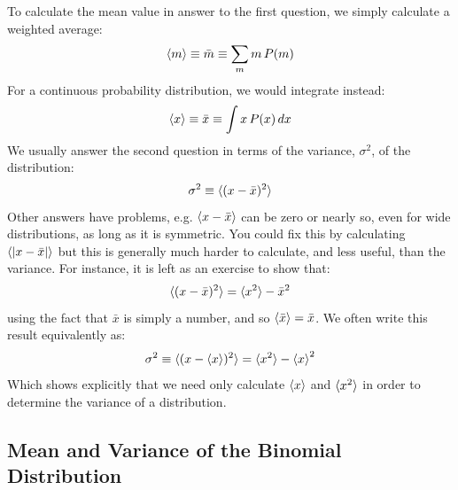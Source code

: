 \documentclass[12pt]{article}
\begin{document}
To calculate the mean value in answer to the first question, we simply calculate a weighted average:
\begin{equation}
\braket{m} \equiv \bar{m} \equiv \sum_m m \, P(m) 
\end{equation}
For a continuous probability distribution, we would integrate instead:
\begin{equation}
\braket{x} \equiv \bar{x} \equiv \int x \, P(x) \, dx 
\end{equation}
We usually answer the second question in terms of the variance, $\sigma^2$, of the distribution:
\begin{displaymath}
\sigma^2 \equiv \braket{(x-\bar{x})^2}
\end{displaymath}
Other answers have problems, e.g. $\braket{x-\bar{x}}$ can be zero or nearly so, even for wide distributions, as long as it is symmetric.  You could fix this by calculating $\braket{|x-\bar{x}|}$ but this is generally much harder to calculate, and less useful, than the variance.  For instance, it is left as an exercise to show that:
\begin{equation}
\label{eqn:varhw}
\braket{(x-\bar{x})^2} = \braket{x^2} -\bar{x}^2
\end{equation}
using the fact that $\bar{x}$ is simply a number, and so $\braket{\bar{x}} = \bar{x}$.  We often write this result equivalently as:
\begin{equation}
\label{eqn:variance}
\sigma^2 \equiv \braket{(x-\braket{x})^2} = \braket{x^2} - \braket{x}^2
\end{equation}
Which shows explicitly that we need only calculate $\braket{x}$ and $\braket{x^2}$ in order to determine the variance of a distribution.

\subsection{Mean and Variance of the Binomial Distribution}
\end{document}
